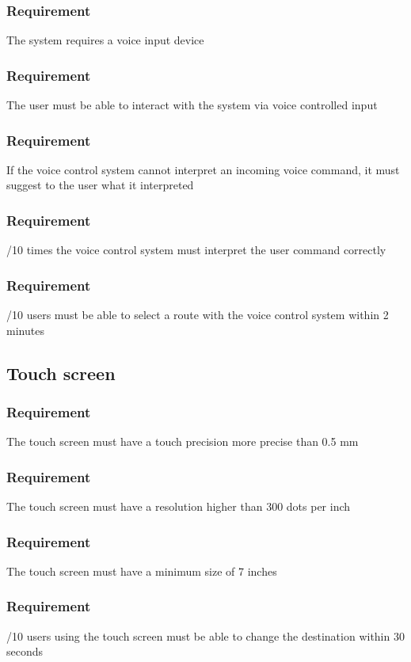 \documentclass{article}
\begin{document}
{      \subsubsection{Requirement}
\hfill \break 
\- \- \-The system requires a voice input device
      \subsubsection{Requirement}
\hfill \break 
\- \- \-The user must be able to interact with the system via voice controlled input
      \subsubsection{Requirement}
\hfill \break 
\- \- \-If the voice control system cannot interpret an incoming voice command, it must suggest to the user what it interpreted
      \subsubsection{Requirement}
\hfill \break 
\- \- /10 times the voice control system must interpret the user command correctly
      \subsubsection{Requirement}
\hfill \break 
\- \- /10 users must be able to select a route with the voice control system within 2 minutes
  \subsection{Touch screen}
      \subsubsection{Requirement}
\hfill \break 
\- \- \-The touch screen must have a touch precision more precise than 0.5 mm
      \subsubsection{Requirement}
\hfill \break 
\- \- \-The touch screen must have a resolution higher than 300 dots per inch
      \subsubsection{Requirement}
\hfill \break 
\- \- \-The touch screen must have a minimum size of 7 inches
      \subsubsection{Requirement}
\hfill \break 
\- \- /10 users using the touch screen must be able to change the destination within 30 seconds
}
\end{document}

